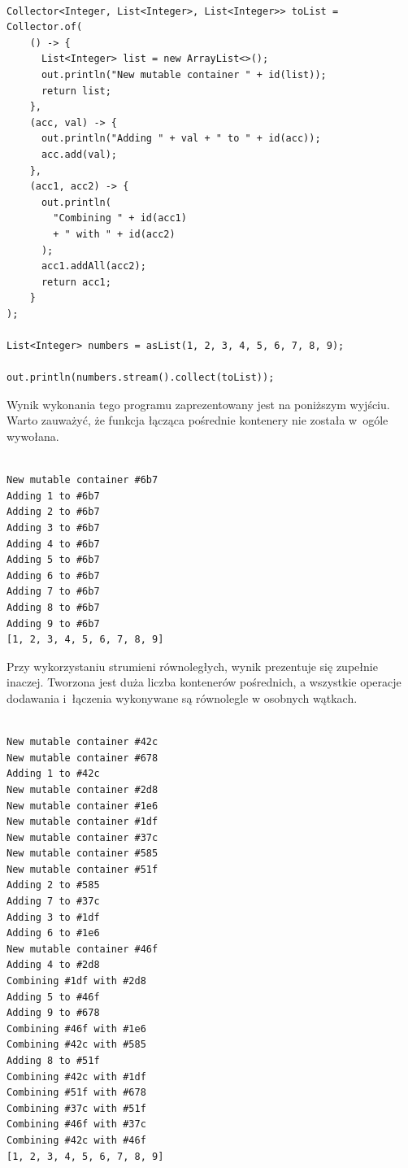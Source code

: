 \documentclass[12pt,twoside,openright]{extarticle}
\begin{document}
\begin{lstlisting}[label=toList, caption=Ręczna implementacja obiektu zbierającego \texttt{toList}]

Collector<Integer, List<Integer>, List<Integer>> toList =
Collector.of(
    () -> {
      List<Integer> list = new ArrayList<>();
      out.println("New mutable container " + id(list));
      return list;
    },
    (acc, val) -> {
      out.println("Adding " + val + " to " + id(acc));
      acc.add(val);
    },
    (acc1, acc2) -> {
      out.println(
        "Combining " + id(acc1)
        + " with " + id(acc2)
      );
      acc1.addAll(acc2);
      return acc1;
    }
);

List<Integer> numbers = asList(1, 2, 3, 4, 5, 6, 7, 8, 9);

out.println(numbers.stream().collect(toList));

\end{lstlisting}

Wynik wykonania tego programu zaprezentowany jest na poniższym wyjściu. Warto zauważyć, że funkcja łącząca pośrednie kontenery nie została w~ogóle wywołana. 
    
\begin{verbatim}

New mutable container #6b7
Adding 1 to #6b7
Adding 2 to #6b7
Adding 3 to #6b7
Adding 4 to #6b7
Adding 5 to #6b7
Adding 6 to #6b7
Adding 7 to #6b7
Adding 8 to #6b7
Adding 9 to #6b7
[1, 2, 3, 4, 5, 6, 7, 8, 9]

\end{verbatim}

Przy wykorzystaniu strumieni równoległych, wynik prezentuje się zupełnie inaczej. Tworzona jest duża liczba kontenerów pośrednich, a wszystkie operacje dodawania i~łączenia wykonywane są równolegle w osobnych wątkach.

\begin{verbatim}

New mutable container #42c
New mutable container #678
Adding 1 to #42c
New mutable container #2d8
New mutable container #1e6
New mutable container #1df
New mutable container #37c
New mutable container #585
New mutable container #51f
Adding 2 to #585
Adding 7 to #37c
Adding 3 to #1df
Adding 6 to #1e6
New mutable container #46f
Adding 4 to #2d8
Combining #1df with #2d8
Adding 5 to #46f
Adding 9 to #678
Combining #46f with #1e6
Combining #42c with #585
Adding 8 to #51f
Combining #42c with #1df
Combining #51f with #678
Combining #37c with #51f
Combining #46f with #37c
Combining #42c with #46f
[1, 2, 3, 4, 5, 6, 7, 8, 9]

\end{verbatim}
\end{document}
